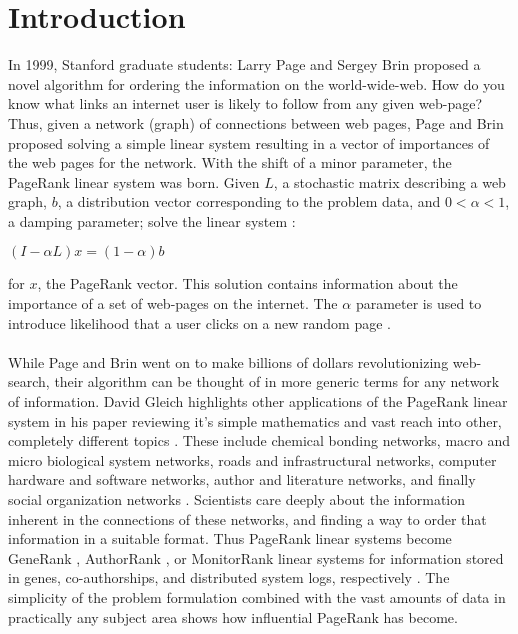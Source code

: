 \documentclass{article}
\begin{document}
\section{Introduction}
In 1999, Stanford graduate students: Larry Page and Sergey Brin proposed a novel algorithm for ordering the information on the world-wide-web. How do you know what links an internet user is likely to follow from any given web-page? Thus, given a network (graph) of connections between web pages, Page and Brin proposed solving a simple linear system resulting in a vector of importances of the web pages for the network. With the shift of a minor parameter, the PageRank linear system was born. Given \textbf{$L$}, a stochastic matrix describing a web graph, \textbf{$b$}, a distribution vector corresponding to the problem data, and $0 < \alpha < 1$, a damping parameter; solve the linear system \cite{Page:1999}:\\
\begin{center}
$(I-\alpha L)x = (1-\alpha)b$ \\
\end{center}
for \textbf{$x$}, the PageRank vector. This solution contains information about the importance of a set of web-pages on the internet. The $\alpha$ parameter is used to introduce likelihood that a user clicks on a new random page \cite{Page:1999}.\\
\\
While Page and Brin went on to make billions of dollars revolutionizing web-search, their algorithm can be thought of in more generic terms for any network of information. David Gleich highlights other applications of the PageRank linear system in his paper reviewing it's simple mathematics and vast reach into other, completely different topics \cite{Gleich:2015}. These include chemical bonding networks, macro and micro biological system networks, roads and infrastructural networks, computer hardware and software networks, author and literature networks, and finally social organization networks \cite{Gleich:2015}. Scientists care deeply about the information inherent in the connections of these networks, and finding a way to order that information in a suitable format. Thus PageRank linear systems become GeneRank \cite{Jiang:2009}, AuthorRank \cite{Liu:2005}, or MonitorRank \cite{Kim:2013} linear systems for information stored in genes, co-authorships, and distributed system logs, respectively \cite{Gleich:2015}. The simplicity of the problem formulation combined with the vast amounts of data in practically any subject area shows how influential PageRank has become.\\
\end{document}

